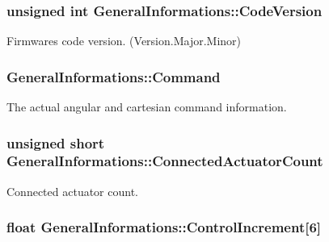 \subsubsection[{\texorpdfstring{Code\+Version}{CodeVersion}}]{\setlength{\rightskip}{0pt plus 5cm}unsigned int General\+Informations\+::\+Code\+Version}\hypertarget{struct_general_informations_ac71288477c2e447e7dd298ca707bcec3}{}\label{struct_general_informations_ac71288477c2e447e7dd298ca707bcec3}


Firmware\textquotesingle{}s code version. (Version.\+Major.\+Minor) 

\subsubsection[{\texorpdfstring{Command}{Command}}]{ General\+Informations\+::\+Command}\hypertarget{struct_general_informations_aff852c9c84a0b313f311e1e222508cf7}{}\label{struct_general_informations_aff852c9c84a0b313f311e1e222508cf7}


The actual angular and cartesian command information. 

\subsubsection[{\texorpdfstring{Connected\+Actuator\+Count}{ConnectedActuatorCount}}]{\setlength{\rightskip}{0pt plus 5cm}unsigned short General\+Informations\+::\+Connected\+Actuator\+Count}\hypertarget{struct_general_informations_ac8f106acda69fb0d0dc7088216854fb0}{}\label{struct_general_informations_ac8f106acda69fb0d0dc7088216854fb0}


Connected actuator count. 

\subsubsection[{\texorpdfstring{Control\+Increment}{ControlIncrement}}]{\setlength{\rightskip}{0pt plus 5cm}float General\+Informations\+::\+Control\+Increment\mbox{[}6\mbox{]}}\hypertarget{struct_general_informations_a361a511d14fdf377e15ce86d6ef3e3c7}{}\label{struct_general_informations_a361a511d14fdf377e15ce86d6ef3e3c7}


